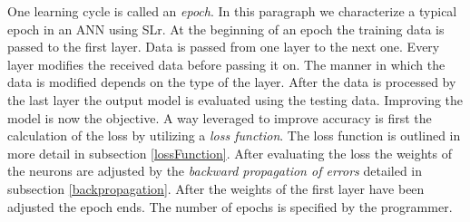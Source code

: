 One learning cycle is called an \textit{epoch}. In this paragraph we characterize a typical epoch in an ANN using SLr. At the beginning of an epoch the training data is passed to the first layer. Data is passed from one layer to the next one. Every layer modifies the received data before passing it on. The manner in which the data is modified depends on the type of the layer. After the data is processed by the last layer the output model is evaluated using the testing data. Improving the model is now the objective. A way leveraged to improve accuracy is first the calculation of the loss by utilizing a \textit{loss function}. The loss function is outlined in more detail in subsection \ref{lossFunction}. After evaluating the loss the weights of the neurons are adjusted by the \textit{backward propagation of errors} detailed in subsection \ref{backpropagation}. After the weights of the first layer have been adjusted the epoch ends. The number of epochs is specified by the programmer. 

